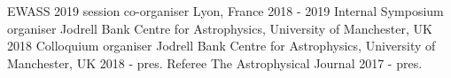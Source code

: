 \begin{cvpress}
   \cvpres
   {EWASS 2019 session co-organiser}
    {Lyon, France}
    {2018 - 2019}
   \cvpres
   {Internal Symposium organiser}
    {Jodrell Bank Centre for Astrophysics, University of Manchester, UK}
    {2018}
   \cvpres
   {Colloquium organiser}
    {Jodrell Bank Centre for Astrophysics, University of Manchester, UK}
    {2018 - pres.}
    \cvpres
   {Referee}
    {The Astrophysical Journal}
    {2017 - pres.}
\end{cvpress}



